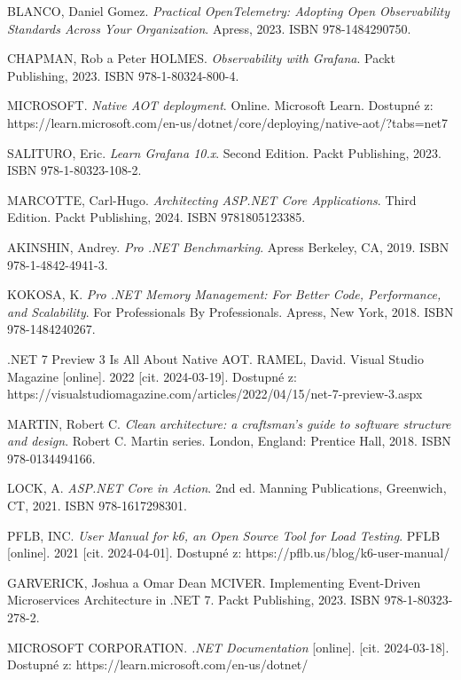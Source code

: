 \documentclass[a4paper,12pt]{article}
\begin{document}
{%
BLANCO, Daniel Gomez. \emph{Practical OpenTelemetry: Adopting Open Observability Standards Across Your Organization}. Apress, 2023. ISBN 978-1484290750.

CHAPMAN, Rob a Peter HOLMES. \emph{Observability with Grafana}. Packt Publishing, 2023. ISBN 978-1-80324-800-4.

MICROSOFT. \emph{Native AOT deployment}. Online. Microsoft Learn. Dostupné z: https://learn.microsoft.com/en-us/dotnet/core/deploying/native-aot/?tabs=net7%

SALITURO, Eric. \emph{Learn Grafana 10.x}. Second Edition. Packt Publishing, 2023. ISBN 978-1-80323-108-2.

MARCOTTE, Carl-Hugo. \emph{Architecting ASP.NET Core Applications}. Third Edition. Packt Publishing, 2024. ISBN 9781805123385.

AKINSHIN, Andrey. \emph{Pro .NET Benchmarking}. Apress Berkeley, CA, 2019. ISBN 978-1-4842-4941-3.

KOKOSA, K. \emph{Pro .NET Memory Management: For Better Code, Performance, and Scalability}. For Professionals By Professionals. Apress, New York, 2018. ISBN 978-1484240267.

.NET 7 Preview 3 Is All About Native AOT. RAMEL, David. Visual Studio Magazine [online]. 2022 [cit. 2024-03-19]. Dostupné z: https://visualstudiomagazine.com/articles/2022/04/15/net-7-preview-3.aspx

MARTIN, Robert C. \emph{Clean architecture: a craftsman's guide to software structure and design}. Robert C. Martin series. London, England: Prentice Hall, 2018. ISBN 978-0134494166.

LOCK, A. \emph{ASP.NET Core in Action}. 2nd ed. Manning Publications, Greenwich, CT, 2021. ISBN 978-1617298301.

PFLB, INC. \emph{User Manual for k6, an Open Source Tool for Load Testing}. PFLB [online]. 2021 [cit. 2024-04-01]. Dostupné z: https://pflb.us/blog/k6-user-manual/

GARVERICK, Joshua a Omar Dean MCIVER. Implementing Event-Driven Microservices Architecture in .NET 7. Packt Publishing, 2023. ISBN 978-1-80323-278-2.

MICROSOFT CORPORATION. \emph{.NET Documentation} [online]. [cit. 2024-03-18]. Dostupné z: https://learn.microsoft.com/en-us/dotnet/

}
\end{document}

